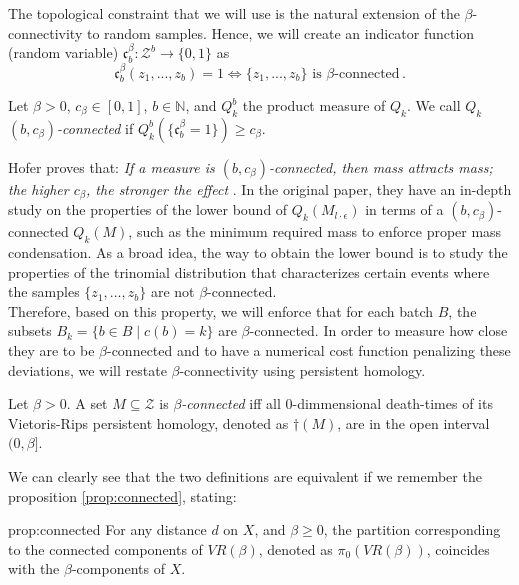 \documentclass[../main.tex]{subfiles}
\begin{document}
The topological constraint that we will use is the natural extension of the $\beta$-connectivity to random samples. Hence, we will create an indicator function (random variable) $\mathfrak{c}_b^\beta: \mathcal{Z}^b \to \{0,1\}$ as 
\[
\mathfrak{c}_b^\beta(z_1, ..., z_b) = 1 \Leftrightarrow \{z_1, ..., z_b\} \text{ is } \beta\text{-connected}\,.
\]
\begin{definition}
Let $\beta>0$, $c_\beta\in [0,1]$, $b\in \mathbb{N}$, and $Q_k^b$ the product measure of $Q_k$. We call $Q_k$ \emph{$(b, c_\beta)$-connected} if $Q_k^b(\{\mathfrak{c}_b^\beta = 1\})\geq c_\beta$.
\end{definition}

Hofer \etal proves that: \emph{If a measure is $(b, c_\beta)$-connected, then mass attracts mass; the higher $c_\beta$, the stronger the effect} \cite{hofer_densified_2021}. In the original paper, they have an in-depth study on the properties of the lower bound of $Q_k(M_{l\cdot \epsilon})$ in terms of a $(b, c_\beta)$-connected $Q_k(M)$, such as the minimum required mass to enforce proper mass condensation. As a broad idea, the way to obtain the lower bound is to study the properties of the trinomial distribution that characterizes certain events where the samples $\{z_1, ..., z_b\}$ are not $\beta$-connected.\\

Therefore, based on this property, we will enforce that for each batch $B$, the subsets $B_k=\{b \in B \mid c(b)=k\}$ are $\beta$-connected. In order to measure how close they are to be $\beta$-connected and to have a numerical cost function penalizing these deviations, we will restate $\beta$-connectivity using persistent homology.

\begin{definition}
Let $\beta>0$. A set $M\subseteq \mathcal{Z}$ is \emph{$\beta$-connected} iff all $0$-dimmensional death-times of its Vietoris-Rips persistent homology, denoted as $\dag(M)$, are in the open interval $(0, \beta]$. 
\end{definition}

We can clearly see that the two definitions are equivalent if we remember the proposition \ref{prop:connected}, stating:

\begin{repproposition}{prop:connected}
For any distance $d$ on $X$, and $\beta \geq 0$, the partition corresponding to the connected components of $VR(\beta)$, denoted as $\pi_0(VR(\beta))$, coincides with the $\beta$-components of $X$.
\end{repproposition}
\end{document}
